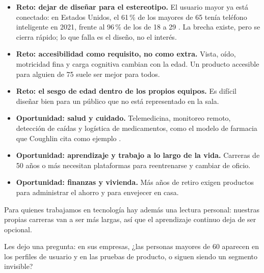 \documentclass[11pt,letterpaper]{article}
\begin{document}
\begin{itemize}
  \item \textbf{Reto: dejar de diseñar para el estereotipo.} El usuario mayor
    ya está conectado: en Estados Unidos, el 61\,\% de los mayores de 65 tenía
    teléfono inteligente en 2021, frente al 96\,\% de los de 18 a 29
    \parencite{faverio2022}. La brecha existe, pero se cierra rápido; lo que
    falla es el diseño, no el interés.
  \item \textbf{Reto: accesibilidad como requisito, no como extra.} Vista,
    oído, motricidad fina y carga cognitiva cambian con la edad. Un producto
    accesible para alguien de 75 suele ser mejor para todos.
  \item \textbf{Reto: el sesgo de edad dentro de los propios equipos.} Es
    difícil diseñar bien para un público que no está representado en la sala.
  \item \textbf{Oportunidad: salud y cuidado.} Telemedicina, monitoreo remoto,
    detección de caídas y logística de medicamentos, como el modelo de
    farmacia que Coughlin cita como ejemplo \parencite{coughlin2017}.
  \item \textbf{Oportunidad: aprendizaje y trabajo a lo largo de la vida.}
    Carreras de 50 años o más necesitan plataformas para reentrenarse y
    cambiar de oficio.
  \item \textbf{Oportunidad: finanzas y vivienda.} Más años de retiro exigen
    productos para administrar el ahorro y para envejecer en casa.
\end{itemize}

Para quienes trabajamos en tecnología hay además una lectura personal: nuestras
propias carreras van a ser más largas, así que el aprendizaje continuo deja de
ser opcional.

Les dejo una pregunta: en sus empresas, ¿las personas mayores de 60 aparecen
en los perfiles de usuario y en las pruebas de producto, o siguen siendo un
segmento invisible?

\printbibliography[title={Referencias}]
\end{document}
